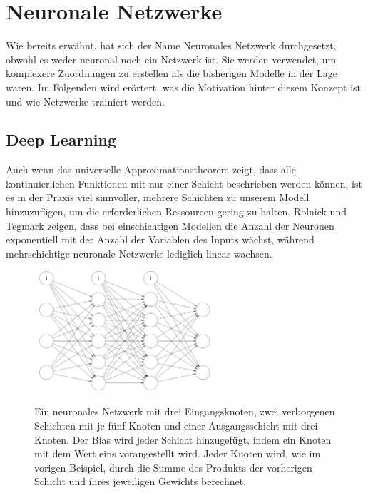 \section{Neuronale Netzwerke} \label{ch:neural_networks}

Wie bereits erwähnt, hat sich der Name Neuronales Netzwerk durchgesetzt, obwohl es weder neuronal noch ein Netzwerk ist.
Sie werden verwendet, um komplexere Zuordnungen zu erstellen als die bisherigen Modelle in der Lage waren.
Im Folgenden wird erörtert, was die Motivation hinter diesem Konzept ist und wie Netzwerke trainiert werden.

\subsection{Deep Learning} \label{ch:deep_learning}

Auch wenn das universelle Approximationstheorem zeigt, dass alle kontinuierlichen Funktionen mit nur einer Schicht beschrieben werden können, ist es in der Praxis viel sinnvoller, mehrere Schichten zu unserem Modell hinzuzufügen, um die erforderlichen Ressourcen gering zu halten.
Rolnick und Tegmark \cite{Rolnick2017} zeigen, dass bei einschichtigen Modellen die Anzahl der Neuronen exponentiell mit der Anzahl der Variablen des Inputs wächst, während mehrschichtige neuronale Netzwerke lediglich linear wachsen.

\begin{figure}
    \centering
    \caption[Neuronales Netzwerk]{ Ein neuronales Netzwerk mit drei Eingangsknoten, zwei verborgenen Schichten mit je fünf Knoten und einer Ausgangsschicht mit drei Knoten. Der Bias wird jeder Schicht hinzugefügt, indem ein Knoten mit dem Wert eins vorangestellt wird. Jeder Knoten wird, wie im vorigen Beispiel, durch die Summe des Produkts der vorherigen Schicht und ihres jeweiligen Gewichts berechnet. }
    \includegraphics[width=0.6\textwidth]{images/2_nn_with_bias.png}
    \label{fig:nn}
\end{figure}

